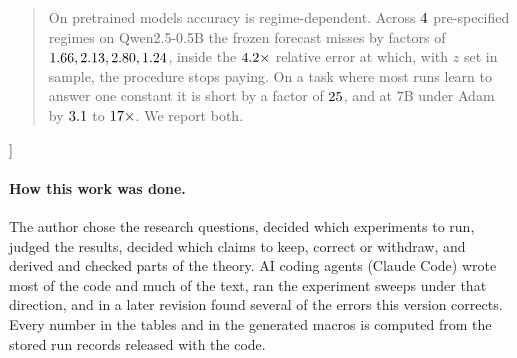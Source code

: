 \documentclass[10pt,twocolumn]{article}
\theoremstyle{definition}
\begin{document}
\begin{minipage}{\textwidth}
\begin{quote}
  On pretrained models accuracy is regime-dependent. Across $4$ pre-specified regimes
  on Qwen2.5-0.5B the frozen forecast misses by factors of $1.66, 2.13, 2.80, 1.24$, inside the
  $4.2\times$ relative error at which, with $z$ set in sample, the procedure stops
  paying. On a task where most runs learn to answer one constant it is short by a factor of
  $25$, and at $7$B under Adam by $3.1$ to
  $17\times$. We report both.
  \end{quote}
  \end{minipage}
  \vspace{6pt}

]

\renewcommand{\thefootnote}{\fnsymbol{footnote}}
\renewcommand{\thefootnote}{\arabic{footnote}}














\paragraph{How this work was done.} The author chose the research questions, decided which
experiments to run, judged the results, decided which claims to keep, correct or withdraw, and
derived and checked parts of the theory. AI coding agents (Claude Code) wrote most of the code and
much of the text, ran the experiment sweeps under that direction, and in a later revision found
several of the errors this version corrects. Every number in the tables and in the generated macros
is computed from the stored run records released with the code.


\end{document}
